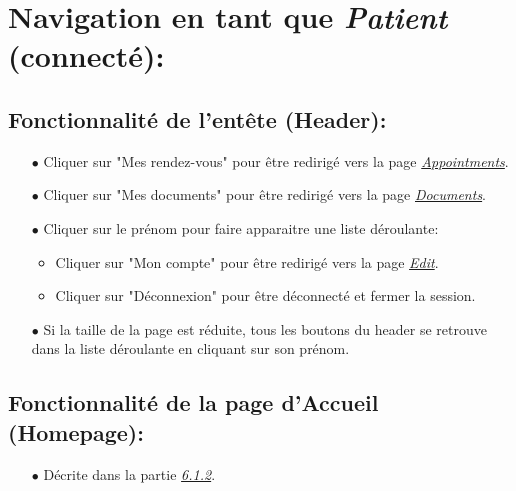 \documentclass[a4paper]{report}
\begin{document}
\vspace{1.5cm}


\section{\noindent Navigation en tant que \textit{Patient} {\fontsize{12}{16}\selectfont(connecté)}: }
\vspace{0.6cm}

\subsection{Fonctionnalité de l'entête (Header):}
    \begin{itemize}
        \item[$\bullet$] Cliquer sur "Mes rendez-vous" pour être redirigé vers la page \textit{\hyperref[appointments]{Appointments}}.
        \item[$\bullet$] Cliquer sur "Mes documents" pour être redirigé vers la page \textit{\hyperref[documents]{Documents}}.
        \item[$\bullet$] Cliquer sur le prénom pour faire apparaitre une liste déroulante:
        \begin{itemize}
            \item Cliquer sur "Mon compte" pour être redirigé vers la page \textit{\hyperref[edit]{Edit}}.
            \item Cliquer sur "Déconnexion" pour être déconnecté et fermer la session.
        \end{itemize}
        \item[$\bullet$] Si la taille de la page est réduite, tous les boutons du header se retrouve dans la liste déroulante en cliquant sur son prénom.
    \end{itemize}
    \vspace{3mm}

\subsection{Fonctionnalité de la page d'Accueil (Homepage):}
    \begin{itemize}
        \item[$\bullet$] Décrite dans la partie \textit{\hyperref[homepage]{6.1.2}}.
    \end{itemize}
    \vspace{3mm}
\end{document}
